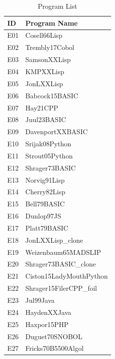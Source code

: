 \documentclass{article}
\begin{document}
\begin{table}[htbp]
\centering
\caption{Program List}
\label{tab:program_list}
\begin{tabular}{|l|l|}
\hline
\textbf{ID} & \textbf{Program Name} \\
\hline
E01 & Cosell66Lisp \\
\hline
E02 & Trembly17Cobol \\
\hline
E03 & SamsonXXLisp \\
\hline
E04 & KMPXXLisp \\
\hline
E05 & JonLXXLisp \\
\hline
E06 & Babcock15BASIC \\
\hline
E07 & Hay21CPP \\
\hline
E08 & Juul23BASIC \\
\hline
E09 & DavenportXXBASIC \\
\hline
E10 & Srijak08Python \\
\hline
E11 & Strout05Python \\
\hline
E12 & Shrager73BASIC \\
\hline
E13 & Norvig91Lisp \\
\hline
E14 & Cherry82Lisp \\
\hline
E15 & Bell79BASIC \\
\hline
E16 & Dunlop97JS \\
\hline
E17 & Platt79BASIC \\
\hline
E18 & JonLXXLisp\_clone \\
\hline
E19 & Weizenbaum65MADSLIP \\
\hline
E20 & Shrager73BASIC\_clone \\
\hline
E21 & Ciston15LadyMouthPython \\
\hline
E22 & Shrager15FilerCPP\_foil \\
\hline
E23 & Jul99Java \\
\hline
E24 & HaydenXXJava \\
\hline
E25 & Haxpor15PHP \\
\hline
E26 & Duguet70SNOBOL \\
\hline
E27 & Fricks70B5500Algol \\
\hline
\end{tabular}
\end{table}
\end{document}

